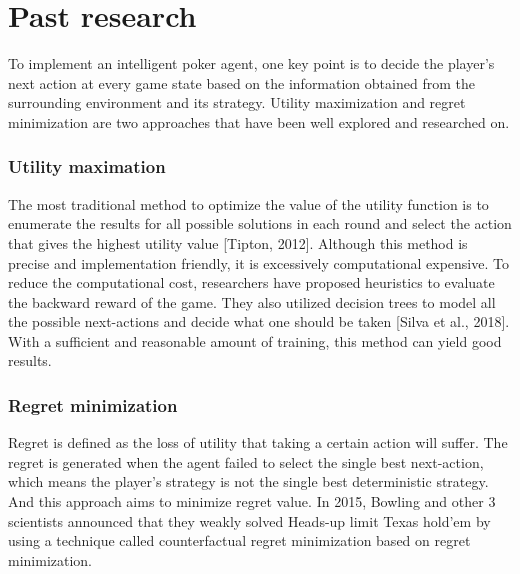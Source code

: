 \documentclass{article}
\begin{document}
\section{Past research}
To implement an intelligent poker agent, one key point is to decide the player’s next action at every game state based on the information obtained from the surrounding environment and its strategy. Utility maximization and regret minimization are two approaches that have been well explored and researched on. 
\subsubsection{Utility maximation}
The most traditional method to optimize the value of the utility function is to enumerate the results for all possible solutions in each round and select the action that gives the highest utility value [Tipton, 2012]. Although this method is precise and implementation friendly, it is excessively computational expensive. To reduce the computational cost, researchers have proposed heuristics to evaluate the backward reward of the game. They also utilized decision trees to model all the possible next-actions and decide what one should be taken [Silva et al., 2018]. With a sufficient and reasonable amount of training, this method can yield good results.
\subsubsection{Regret minimization}
Regret is defined as the loss of utility that taking a certain action will suffer. The regret is generated when the agent failed to select the single best next-action, which means the player’s strategy is not the single best deterministic strategy. And this approach aims to minimize regret value. In 2015, Bowling and other 3 scientists announced that they weakly solved Heads-up limit Texas hold’em by using a technique called counterfactual regret minimization based on regret minimization. 
\end{document}

